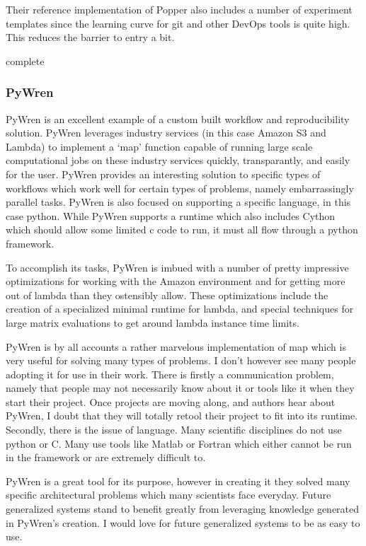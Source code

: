 \documentclass[american]{article}
\newcommand{\complete}{
	\gls{complete}
}
\begin{document}
Their reference implementation of Popper also includes a number of experiment templates since the learning curve for git and other DevOps tools is quite high. This reduces the barrier to entry a bit.

\complete

\subsubsection{PyWren} \label{sec:software-managers-pywren}

PyWren is an excellent example of a custom built workflow and reproducibility solution. PyWren leverages industry services (in this case Amazon S3 and Lambda) to implement a `map' function capable of running large scale computational jobs on these industry services quickly, transparantly, and easily for the user. PyWren provides an interesting solution to specific types of workflows which work well for certain types of problems, namely embarrassingly parallel tasks. PyWren is also focused on supporting a specific language, in this case python. While PyWren supports a runtime which also includes Cython which should allow some limited c code to run, it must all flow through a python framework.

To accomplish its tasks, PyWren is imbued with a number of pretty impressive optimizations for working with the Amazon environment and for getting more out of lambda than they ostensibly allow. These optimizations include the creation of a specialized minimal runtime for lambda, and special techniques for large matrix evaluations to get around lambda instance time limits.

PyWren is by all accounts a rather marvelous implementation of map which is very useful for solving many types of problems. I don't however see many people adopting it for use in their work. There is firstly a communication problem, namely that people may not necessarily know about it or tools like it when they start their project. Once projects are moving along, and authors hear about PyWren, I doubt that they will totally retool their project to fit into its runtime. Secondly, there is the issue of language. Many scientific disciplines do not use python or C. Many use tools like Matlab or Fortran which either cannot be run in the framework or are extremely difficult to.

PyWren is a great tool for its purpose, however in creating it they solved many specific architectural problems which many scientists face everyday. Future generalized systems stand to benefit greatly from leveraging knowledge generated in PyWren's creation. I would love for future generalized systems to be as easy to use.
\end{document}
